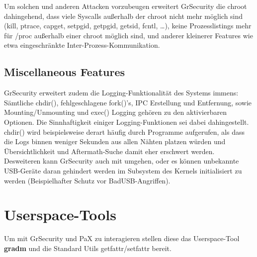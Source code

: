 Um solchen und anderen Attacken vorzubeugen erweitert GrSecurity die chroot dahingehend, dass viele Syscalls außerhalb der chroot nicht mehr möglich sind (kill, ptrace, capget, setpgid, getpgid, getsid, fcntl, \dots), keine Prozesslistings mehr für /proc außerhalb einer chroot möglich sind, und anderer kleinerer Features wie etwa eingeschränkte Inter-Prozess-Kommunikation.

\subsection{Miscellaneous Features}
\label{subsec:Miscellaneous Features}
GrSecurity erweitert zudem die Logging-Funktionalität des Systems immens: Sämtliche chdir(), fehlgeschlagene fork()'s, IPC Erstellung und Entfernung, sowie Mounting/Unmounting und exec() Logging gehören zu den aktivierbaren Optionen. Die Sinnhaftigkeit einiger Logging-Funktionen sei dabei dahingestellt. chdir() wird beispielsweise derart häufig durch Programme aufgerufen, als dass die Logs binnen weniger Sekunden aus allen Nähten platzen würden und Übersichtlichkeit und Aftermath-Suche damit eher erschwert werden.\\
Desweiteren kann GrSecurity auch mit  umgehen, oder es können unbekannte USB-Geräte daran gehindert werden im Subsystem des Kernels initialisiert zu werden (Beispielhafter Schutz vor BadUSB-Angriffen).

\section{Userspace-Tools}
\label{sec:Userspace-Tools}
Um mit GrSecurity und PaX zu interagieren stellen diese das Userspace-Tool \textbf{gradm} und die Standard Utils getfattr/setfattr bereit.

